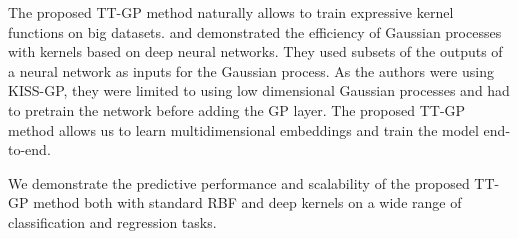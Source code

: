 The proposed TT-GP method naturally allows to train expressive kernel functions 
on big datasets. \citet{wilson2016deep} and \citet{wilson2016stochastic}
demonstrated the efficiency of Gaussian processes with kernels based on deep 
neural networks. They used subsets of the outputs of a neural network as 
inputs for the Gaussian process. As the authors were using KISS-GP, they
were limited to using low dimensional Gaussian processes and had to
pretrain the network before adding the GP layer. The proposed TT-GP method
allows us to learn multidimensional embeddings and train the model end-to-end.

We demonstrate the predictive performance and scalability of the proposed TT-GP 
method both with standard RBF and deep kernels on a wide range of classification
and regression tasks. 

